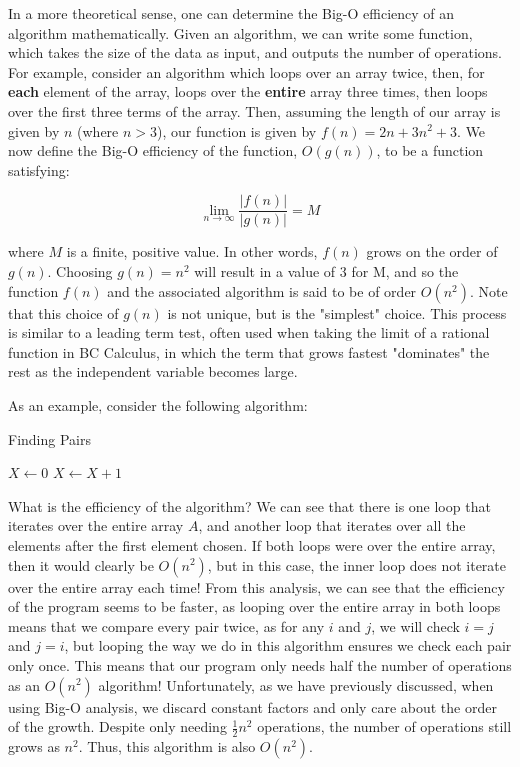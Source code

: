 In a more theoretical sense, one can determine the Big-O efficiency of an algorithm mathematically.  Given an algorithm, we can write some function, which takes the size of the data as input, and outputs the number of operations.  For example, consider an algorithm which loops over an array twice, then, for \textbf{each} element of the array, loops over the \textbf{entire} array three times, then loops over the first three terms of the array.  Then, assuming the length of our array is given by $ n $ (where $ n > 3 $), our function is given by $ f(n) = 2n + 3n^2 + 3 $.  We now define the Big-O efficiency of the function, $ O(g(n)) $, to be a function satisfying:

$$ \lim_{n \to \infty}{\frac{|f(n)|}{|g(n)|}} = M $$

\noindent where $ M $ is a finite, positive value.  In other words, $ f(n) $ grows on the order of $ g(n) $.  Choosing $ g(n) = n^2 $ will result in a value of $ 3 $ for M, and so the function $ f(n) $ and the associated algorithm is said to be of order $ O(n^2) $.  Note that this choice of $ g(n) $ is not unique, but is the "simplest" choice.  This process is similar to a leading term test, often used when taking the limit of a rational function in BC Calculus, in which the term that grows fastest "dominates" the rest as the independent variable becomes large.

As an example, consider the following algorithm:

\begin{algorithm}[H]
\caption{Finding Pairs}
\begin{algorithmic}
\State $ X \gets 0 $
            \State $X \gets X + 1$
        \EndIf
    \EndFor
\EndFor
\end{algorithmic}
\end{algorithm}


What is the efficiency of the algorithm?  We can see that there is one loop that iterates over the entire array $ A $, and another loop that iterates over all the elements after the first element chosen.  If both loops were over the entire array, then it would clearly be $ O(n^2) $, but in this case, the inner loop does not iterate over the entire array each time!  From this analysis, we can see that the efficiency of the program seems to be faster, as looping over the entire array in both loops means that we compare every pair twice, as for any $ i $ and $ j $, we will check $ i = j $ and $ j = i $, but looping the way we do in this algorithm ensures we check each pair only once.  This means that our program only needs half the number of operations as an $ O(n^2) $ algorithm!  Unfortunately, as we have previously discussed, when using Big-O analysis, we discard constant factors and only care about the order of the growth.  Despite only needing $ \frac{1}{2}n^2 $ operations, the number of operations still grows as $n^2$.  Thus, this algorithm is also $ O(n^2) $.

